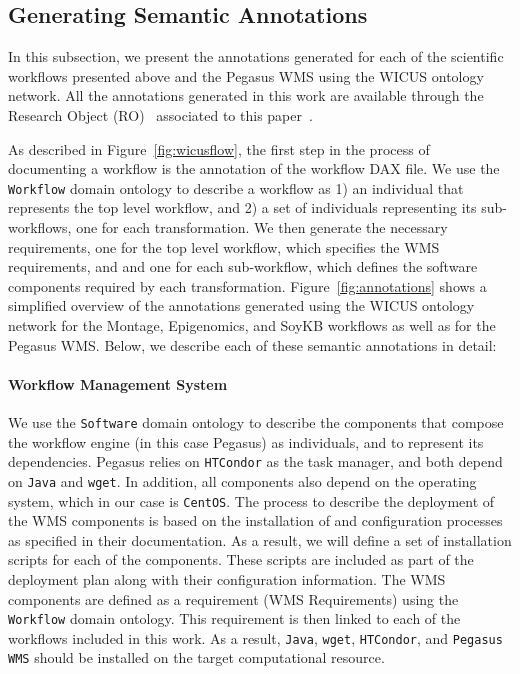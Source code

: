 \subsection{Generating Semantic Annotations}

In this subsection, we present the annotations generated for each of the scientific 
workflows presented above and the Pegasus WMS using the WICUS ontology
network. All the annotations generated in this work are available through the 
Research Object (RO)~\cite{researchObjects} associated to this paper~\cite{fgcs-2015-object}.

 As described in Figure~\ref{fig:wicusflow}, the first step in the process of 
documenting a workflow is the annotation of the workflow DAX file. We use the 
\texttt{Workflow} domain ontology to describe a workflow as 1) an individual that 
represents the top level workflow, and 2) a set of individuals representing its 
sub-workflows, one for each transformation. We then generate the necessary 
requirements, one for the top level workflow, which specifies the WMS requirements, and
and one for each sub-workflow, which defines the software components required 
by each transformation. 
Figure~\ref{fig:annotations} shows a simplified overview of the annotations generated 
using the WICUS ontology network for the Montage, Epigenomics, and SoyKB 
workflows as well as for the Pegasus WMS. Below, we describe each of these
semantic annotations in detail:


\paragraph{\textbf{Workflow Management System}}
We use the \texttt{Software} domain ontology to describe the components that
compose the workflow engine (in this case Pegasus) as individuals, and to 
represent its dependencies. Pegasus relies on \texttt{HTCondor} as the task manager, and 
both depend on \texttt{Java} and \texttt{wget}. In addition, all components also
depend on the operating system, which in our case is \texttt{CentOS}. The process
to describe the deployment of the WMS components is based on the installation of
and configuration processes as specified in their documentation. As a result, we will
define a set of installation scripts for each of the components. These scripts are 
included as part of the deployment plan along with their configuration information.
The WMS components are defined as a requirement (WMS Requirements) using
the \texttt{Workflow} domain ontology. This requirement is then linked to each
of the workflows included in this work. As a result, \texttt{Java}, \texttt{wget}, 
\texttt{HTCondor}, and \texttt{Pegasus WMS} should be installed on the target
computational resource.


